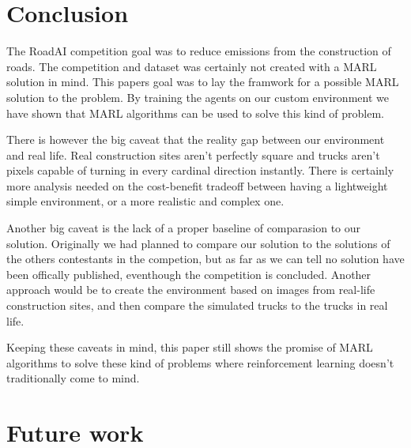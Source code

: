 \documentclass[conference]{IEEEtran}
\begin{document}
	\section{Conclusion}

	The RoadAI competition goal was to reduce \coo{} emissions from the construction of roads.
	The competition and dataset was certainly not created with a MARL solution in mind.
	This papers goal was to lay the framwork for a possible MARL solution to the problem.
	By training the agents on our custom environment we have shown that MARL algorithms can be used to solve
	this  kind of problem.

	There is however the big caveat that the reality gap between our environment and real life.
	Real construction sites aren't perfectly square and trucks aren't pixels capable of turning in every
	cardinal direction instantly. There is certainly more analysis needed on the cost-benefit tradeoff
	between having a lightweight simple environment, or a more realistic and complex one.

	Another big caveat is the lack of a proper baseline of comparasion to our solution.
	Originally we had planned to compare our solution to the solutions of the others contestants in the
	competion, but as far as we can tell no solution have been offically published, eventhough the competition
	is concluded. Another approach would be to create the environment based on images from real-life
	construction sites, and then compare the simulated trucks to the trucks in real life.

	Keeping these caveats in mind, this paper still shows the promise of MARL algorithms to solve these kind of
	problems where reinforcement learning doesn't traditionally come to mind.


	\section{Future work}
\end{document}
